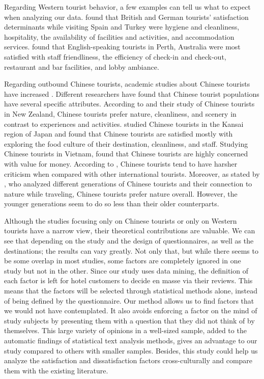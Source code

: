 \documentclass[smallextended,natbib]{svjour3}       %
\begin{document}
Regarding Western tourist behavior, a few examples can tell us what to expect when analyzing our data. \cite{kozak2002} found that British and German tourists' satisfaction determinants while visiting Spain and Turkey were hygiene and cleanliness, hospitality, the availability of facilities and activities, and accommodation services. \cite{shanka2004} found that English-speaking tourists in Perth, Australia were most satisfied with staff friendliness, the efficiency of check-in and check-out, restaurant and bar facilities, and lobby ambiance. 

Regarding outbound Chinese tourists, academic studies about Chinese tourists have increased \cite[][]{sun2017}. Different researchers have found that Chinese tourist populations have several specific attributes. According to \cite{ryan2001} and their study of Chinese tourists in New Zealand, Chinese tourists prefer nature, cleanliness, and scenery in contrast to experiences and activities. \cite{dongyang2015} studied Chinese tourists in the Kansai region of Japan and found that Chinese tourists are satisfied mostly with exploring the food culture of their destination, cleanliness, and staff. Studying Chinese tourists in Vietnam, \cite{truong2009} found that Chinese tourists are highly concerned with value for money. According to \cite{liu2019}, Chinese tourists tend to have harsher criticism when compared with other international tourists. Moreover, as stated by \cite{gao2017chinese}, who analyzed different generations of Chinese tourists and their connection to nature while traveling, Chinese tourists prefer nature overall. However, the younger generations seem to do so less than their older counterparts. 

Although the studies focusing only on Chinese tourists or only on Western tourists have a narrow view, their theoretical contributions are valuable. We can see that depending on the study and the design of questionnaires, as well as the destinations; the results can vary greatly. Not only that, but while there seems to be some overlap in most studies, some factors are completely ignored in one study but not in the other. Since our study uses data mining, the definition of each factor is left for hotel customers to decide en masse via their reviews. This means that the factors will be selected through statistical methods alone, instead of being defined by the questionnaire. Our method allows us to find factors that we would not have contemplated. It also avoids enforcing a factor on the mind of study subjects by presenting them with a question that they did not think of by themselves. This large variety of opinions in a well-sized sample, added to the automatic findings of statistical text analysis methods, gives an advantage to our study compared to others with smaller samples. Besides, this study could help us analyze the satisfaction and dissatisfaction factors cross-culturally and compare them with the existing literature.
\end{document}
